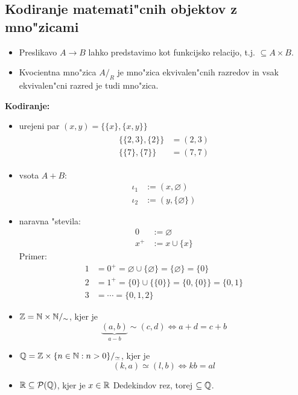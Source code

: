\subsection{Kodiranje matemati"cnih objektov z mno"zicami}
\begin{itemize}
	\item Preslikavo $A \to B$ lahko predstavimo kot funkcijsko relacijo, t.j. $\subseteq A \times B$.
	\item Kvocientna mno"zica $A/_R$ je mno"zica ekvivalen"cnih razredov in vsak ekvivalen"cni razred je tudi mno"zica.
\end{itemize}
\textbf{Kodiranje:}
\begin{itemize}
	\item urejeni par $(x, y) = \{\{x\}, \{x, y\} \}$
	\begin{gather*}
	\begin{aligned}
	\{\{2, 3\}, \{2\} \} &= (2, 3) \\
	\{\{7\}, \{7\} \} &= (7, 7)
	\end{aligned}
	\end{gather*}

	\item vsota $A + B$:
	\begin{align*}
	\iota_1 &:= (x, \varnothing) \\
	\iota_2 &:= (y, \{\varnothing\})
	\end{align*}
	
	\item naravna "stevila:
	\begin{align*}
	0 &:= \varnothing\\
	x^+ &:= x \cup \{x\}
	\end{align*}
	Primer:
	\begin{align*}
	1 &= 0^+ = \varnothing \cup \{\varnothing\} = \{\varnothing\} = \{0\} \\
	2 &= 1^+ = \{0\} \cup \{\{0\}\} = \{0, \{0\}\} = \{0, 1\} \\
	3 &= \cdots = \{0, 1, 2\}
	\end{align*}
	
	\item $\mathbb{Z} = \mathbb{N} \times \mathbb{N}/_\sim$, kjer je 
	\begin{equation*}
	\underbrace{(a, b)}_{a-b} \sim (c, d) \iff a + d = c + b
	\end{equation*}
	
	\item $\mathbb{Q} = \mathbb{Z} \times \{n \in \mathbb{N}: n > 0\} /_\simeq$, kjer je
	\begin{equation*}
	(k, a) \simeq (l, b) \iff kb = al
	\end{equation*}
	
	\item $\mathbb{R} \subseteq \mathcal{P}(\mathbb{Q})$, kjer je $x \in \mathbb{R}$ Dedekindov rez, torej $\subseteq \mathbb{Q}$.
\end{itemize}
